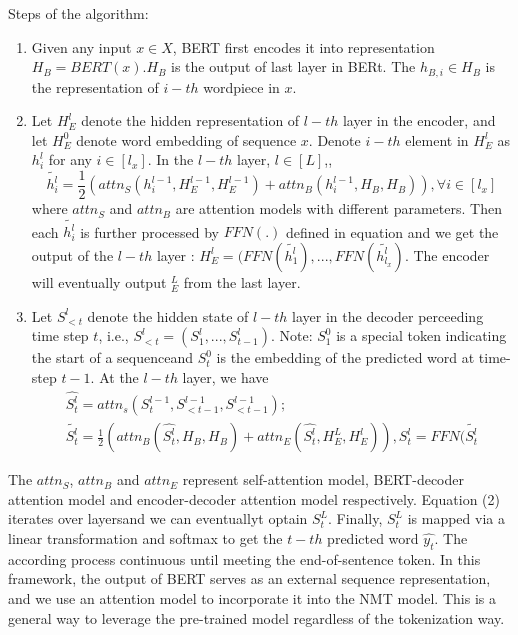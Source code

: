\documentclass{report}
\begin{document}
Steps of the algorithm:
\begin{enumerate}
	\item Given any input $x \in X$, BERT first encodes it into representation $H_B=BERT(x). H_B$ is the output of last layer in BERt. The $h_{B, i} \in H_B$ is the representation of $i-th$ wordpiece in $x$.
	\item Let $H_E^l$ denote the hidden representation of $l-th$ layer in the encoder, and let $H_E^0$ denote word embedding of sequence $x$. Denote $i-th$ element in $H_E^l$ as $h_i^l$ for any $i \in [l_x]$. In the $l-th$ layer, $l \in [L]$,,
	\begin{equation}
		\tilde{h_i^l}= \frac{1}{2} (attn_S(h_i^{l-1}, H_E^{l-1}, H_E^{l-1}) + attn_B(h_i^{l-1}, H_B, H_B)), \forall i \in [l_x] 
		\label{eq:bert-fused-input-for-new-layer} %
	\end{equation}
	where $attn_S$ and $attn_B$ are attention models %
	with different parameters. Then each $\tilde{h_i^l}$ is further processed by $FFN(.)$ defined in equation %
	and we get the output of the $l-th$ layer : $H_E^l = (FFN(\tilde{h_1^l}), ..., FFN(\tilde{h_{l_x}^l})$. The encoder will eventually output $_E^L$ from the last layer.
\item Let $S_{<t}^l$ denote the hidden state of $l-th$ layer in the decoder perceeding time step $t$, i.e., $S_{<t}^l = (S_1^l, ..., S_{t-1}^l)$. Note: $S_1^0$ is a special token indicating the start of a sequenceand $S_t^0$ is the embedding of the predicted word at time-step $t-1$. At the $l-th$ layer, we have 
	\begin{equation}
		\begin{aligned}
\hat{S_t^l}= attn_s(S_t^{l-1}, S_{<t-1}^{l-1}, S_{<t-1}^{l-1}); \\
\tilde{S_t^l}= \frac{1}{2}(attn_B(\hat{S_t^l}, H_B, H_B) + attn_E(\hat{S_t^l}, H_E^L, H_E^l)), S_t^l = FFN(\tilde{S_t^l} %
\label{eq:bert-fused-hidden-state} %
	\end{aligned}
	\end{equation}
\end{enumerate}

The $attn_S$, $attn_B$ and $attn_E$ represent self-attention model, BERT-decoder attention model and encoder-decoder attention model respectively. Equation (2) %
iterates over layersand we can eventuallyt optain $S_t^L$. Finally, $S_t^L$ is mapped via a linear transformation and softmax to get the $t-th$ predicted word $\hat{y_t}$. The according process continuous until meeting the end-of-sentence token.
In this framework, the output of BERT serves as an external sequence representation, and we use an attention model to incorporate it into the NMT model. This is a general way to leverage the pre-trained model regardless of the tokenization way.
\end{document}
